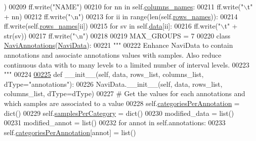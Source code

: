 \begin{DoxyCode}
{      })
00209                 ff.write(\textcolor{stringliteral}{"NAME"})
00210             \textcolor{keywordflow}{for} nn \textcolor{keywordflow}{in} self.\hyperlink{classnavicom_1_1navidata_1_1NaviData_aebce9bba220d01776cbd5a214d2d3013}{columns_names}:
00211                 ff.write(\textcolor{stringliteral}{"\(\backslash\)t"} + nn)
00212             ff.write(\textcolor{stringliteral}{"\(\backslash\)n"})
00213             \textcolor{keywordflow}{for} ii \textcolor{keywordflow}{in} range(len(self.\hyperlink{classnavicom_1_1navidata_1_1NaviData_aef041665583f2aa0845418d378ce3a40}{rows_names})):
00214                 ff.write(self.\hyperlink{classnavicom_1_1navidata_1_1NaviData_aef041665583f2aa0845418d378ce3a40}{rows_names}[ii])
00215                 \textcolor{keywordflow}{for} sv \textcolor{keywordflow}{in} self.\hyperlink{classnavicom_1_1navidata_1_1NaviData_a25ff2e12663e590c22e82bb9a7863987}{data}[ii]:
00216                     ff.write(\textcolor{stringliteral}{"\(\backslash\)t"} + str(sv))
00217                 ff.write(\textcolor{stringliteral}{"\(\backslash\)n"})
00218             
00219 MAX\_GROUPS = 7
00220 \textcolor{keyword}{class }\hyperlink{classnavicom_1_1navidata_1_1NaviAnnotations}{NaviAnnotations}(\hyperlink{classnavicom_1_1navidata_1_1NaviData}{NaviData}):
00221     \textcolor{stringliteral}{"""}
00222 \textcolor{stringliteral}{    Enhance NaviData to contain annotations and associate annotations values with
       samples. Also reduce continuous data with to many levels to a limited number of 
      interval levels.}
00223 \textcolor{stringliteral}{    """}
00224 
\hypertarget{navidata_8py_source_l00225}{}\hyperlink{classnavicom_1_1navidata_1_1NaviAnnotations}{00225}     \textcolor{keyword}{def }\_\_init\_\_(self, data, rows\_list, columns\_list, dType="annotations"):
00226         NaviData.\_\_init\_\_(self, data, rows\_list, columns\_list, dType=dType)
00227         \textcolor{comment}{# Get the values for each annotations and which samples are associated to
       a value}
00228         self.\hyperlink{classnavicom_1_1navidata_1_1NaviAnnotations_a1c26e115cb2eabe4384cd2fa0c7f776f}{categoriesPerAnnotation} = dict()
00229         self.\hyperlink{classnavicom_1_1navidata_1_1NaviAnnotations_a7cbb4ab623948f19e055f5b4b7c938a9}{samplesPerCategory} = dict()
00230         modified\_data = list()
00231         modified\_annot = list()
00232         \textcolor{keywordflow}{for} annot \textcolor{keywordflow}{in} self.annotations:
00233             self.\hyperlink{classnavicom_1_1navidata_1_1NaviAnnotations_a1c26e115cb2eabe4384cd2fa0c7f776f}{categoriesPerAnnotation}[annot] = list()

\end{DoxyCode}
